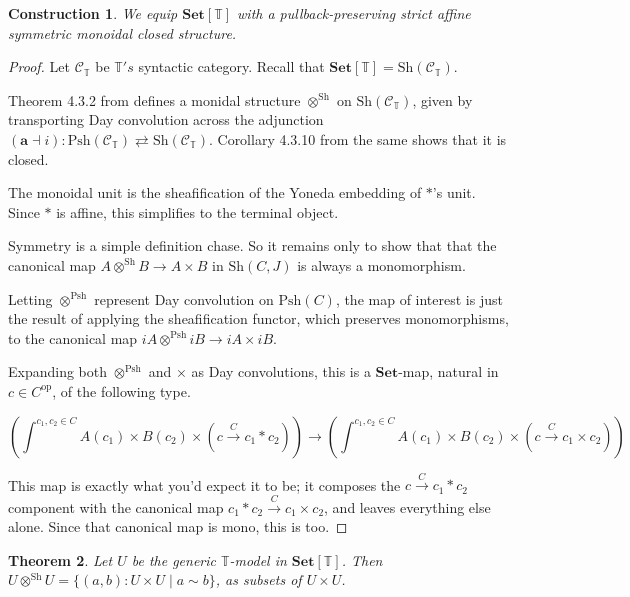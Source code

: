 \documentclass{article}
\newtheorem{theorem}{Theorem}[section]
\newtheorem{construction}[theorem]{Construction}
\newcommand*{\Set}{\mathbf{Set}}
\newcommand*{\Sh}{\mathrm{Sh}}
\newcommand*{\Psh}{\mathrm{Psh}}
\newcommand*{\C}{\mathcal{C}}
\newcommand*{\T}{\mathbb{T}}
\begin{document}
\begin{construction} \label{sh}
    We equip \(\Set[\T]\) with a pullback-preserving strict affine symmetric monoidal closed structure.
\end{construction}

\begin{proof}
    Let \(\C_\T\) be \(\T's\) syntactic category. Recall that \(\Set[\T] = \Sh(\C_\T)\).

    Theorem 4.3.2 from \cite{biering} defines a monidal structure \(\otimes^\Sh\) on \(\Sh(\C_\T)\),
    given by transporting Day convolution across the adjunction \((\mathbf{a} \dashv i) : \Psh(\C_\T) \rightleftarrows \Sh(\C_\T)\).
    Corollary 4.3.10 from the same shows that it is closed.

    The monoidal unit is the sheafification of the Yoneda embedding of \(*\)'s unit.
    Since \(*\) is affine, this simplifies to the terminal object.

    Symmetry is a simple definition chase. So it remains only to show that
    that the canonical map \(A \otimes^\Sh B \to A \times B\) in \(\Sh(C,J)\) is always a monomorphism.

    Letting \(\otimes^\Psh\) represent Day convolution on \(\Psh(C)\),
    the map of interest is just the result of applying the sheafification functor,
    which preserves monomorphisms, to the canonical map \(iA \otimes^\Psh iB \to iA \times iB\).

    Expanding both \(\otimes^\Psh\) and \(\times\) as Day convolutions,
    this is a \(\Set\)-map, natural in \(c \in C^\mathrm{op}\), of the following type.
    \begin{scriptsize}\[\left(\int^{c_1,c_2 \in C} A(c_1) \times B(c_2) \times (c \xrightarrow{C} c_1 * c_2)\right) \to \left(\int^{c_1,c_2 \in C} A(c_1) \times B(c_2) \times (c \xrightarrow{C} c_1 \times c_2)\right)\]\end{scriptsize}
    This map is exactly what you'd expect it to be; it composes the \(c \xrightarrow{C} c_1 * c_2\) component
    with the canonical map \(c_1 * c_2 \xrightarrow{C} c_1 \times c_2\), and leaves everything else alone.
    Since that canonical map is mono, this is too.

\end{proof}

\begin{theorem}
    Let \(U\) be the generic \(\T\)-model in \(\Set[\T]\).
    Then \(U \otimes^\Sh U = \{(a,b) : U \times U \mid a \sim b\}\), as subsets of \(U \times U\).
\end{theorem}
\end{document}
